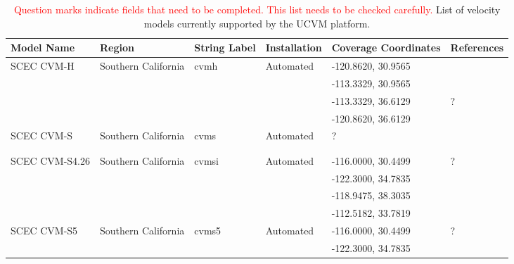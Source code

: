 
\begin{table*}[ht!]
\centering
\small
\caption{\textcolor{red}{Question marks indicate fields that need to be completed. This list needs to be checked carefully.} List of velocity models currently supported by the UCVM platform.}
\begin{tabular}[]{lllllp{1.25in}}
\\
Model Name         & Region                & String Label & Installation & Coverage Coordinates & References \\
\hline
SCEC CVM-H         & Southern California   & cvmh          &  Automated   & -120.8620, 30.9565 & \citet{Plesch_2011_SCEC}     \\
                   &                       &               &              & -113.3329, 30.9565 & \citet{CVM-H_Manual}         \\
                   &                       &               &              & -113.3329, 36.6129 & ?                            \\
                   &                       &               &              & -120.8620, 36.6129 &                              \\ 
SCEC CVM-S         & Southern California   & cvms          &  Automated   & ?                  & \citet{Magistrale_1996_BSSA} \\
                   &                       &               &              &                    & \citet{Magistrale_2000_BSSA} \\
                   &                       &               &              &                    & \citet{Kohler_2003_BSSA}     \\
SCEC CVM-S4.26     & Southern California   & cvmsi         &  Automated   & -116.0000, 30.4499 & ?                            \\
                   &                       &               &              & -122.3000, 34.7835 &                              \\
                   &                       &               &              & -118.9475, 38.3035 &                              \\
                   &                       &               &              & -112.5182, 33.7819 &                              \\
SCEC CVM-S5        & Southern California   & cvms5         &  Automated   & -116.0000, 30.4499 & ?                            \\
                   &                       &               &              & -122.3000, 34.7835 &                              \\

\end{tabular}
\end{table*}
